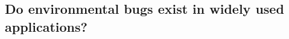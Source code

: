 %
%
%
%


\subsection{Do environmental bugs  exist in widely used applications?}
\label{sec-env-bugs}


